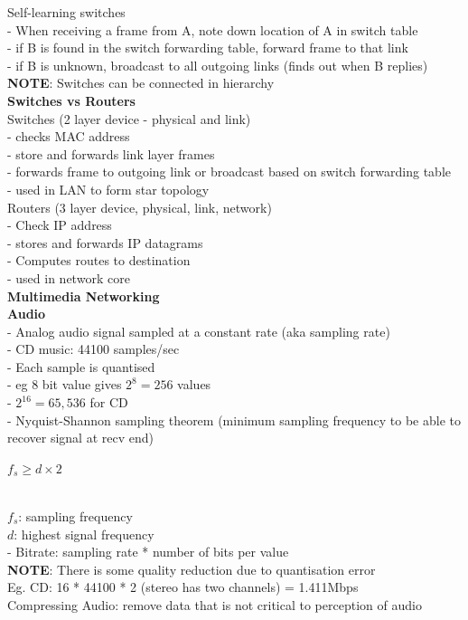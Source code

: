 \documentclass[10pt, a4paper]{article}
\newcommand{\highlight}[1]{{\color{red}\textbf{#1}}}
\newcommand{\red}[1]{{\color{red}#1}}
\newcommand{\green}[1]{{\color{ForestGreen}#1}}
\newcommand{\tab}[0]{\hspace*{2mm}}
\begin{document}
\begin{multicols*}{3}
		Self-learning switches\\
		- When receiving a frame from A, note down location of A in switch table\\
		- if B is \green{found} in the switch forwarding table, forward frame to that link\\
		- if B is \red{unknown}, broadcast to \red{all outgoing links} (finds out when B replies)\\
		\highlight{NOTE}: Switches can be connected in hierarchy\\

		\textbf{Switches vs Routers}\\
		Switches (2 layer device - physical and link)\\
		- checks \red{MAC} address\\
		- store and forwards \red{link layer} frames\\
		- forwards frame to outgoing link or broadcast based on switch forwarding table\\
		- used in LAN to form star topology\\
		Routers (3 layer device, physical, link, network)\\
		- Check \red{IP} address\\
		- stores and forwards \red{IP} datagrams\\
		- Computes routes to destination\\
		- used in network core\\

		{\normalsize\textbf{Multimedia Networking}}\\

		\textbf{Audio}\\
		- Analog audio signal sampled at a constant rate (aka sampling rate)\\
		\tab - CD music: 44100 samples/sec\\
		- Each sample is quantised\\
		\tab - eg 8 bit value gives $2^{8}=256$ values\\
		\tab - $2^{16} =65,536$ for CD\\
		- Nyquist-Shannon sampling theorem (minimum sampling frequency to be able to recover signal at recv end)\\
		\centerline{$f_{s} \geq d \times 2$}\\
		\tab $f_{s}$: sampling frequency\\
		\tab $d$: highest signal frequency\\
		- Bitrate: sampling rate * number of bits per value\\
		\highlight{NOTE}: There is some quality reduction due to quantisation error\\
		Eg. CD: 16 * 44100 * 2 (stereo has two channels) = 1.411Mbps\\
		Compressing Audio: remove data that is not critical to perception of audio\\


\end{multicols*}
\end{document}

